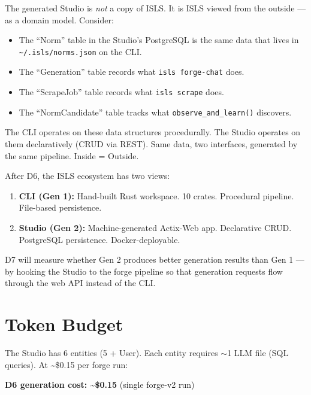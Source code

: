 \documentclass[11pt,a4paper]{article}
\begin{document}
The generated Studio is \emph{not} a copy of ISLS. It is ISLS viewed
from the outside --- as a domain model. Consider:

\begin{itemize}[nosep]
\item The ``Norm'' table in the Studio's PostgreSQL is the same data
      that lives in \texttt{\textasciitilde/.isls/norms.json} on the CLI.
\item The ``Generation'' table records what \texttt{isls forge-chat}
      does.
\item The ``ScrapeJob'' table records what \texttt{isls scrape} does.
\item The ``NormCandidate'' table tracks what
      \texttt{observe\_and\_learn()} discovers.
\end{itemize}

The CLI operates on these data structures procedurally. The Studio
operates on them declaratively (CRUD via REST). Same data, two
interfaces, generated by the same pipeline. Inside = Outside.

After D6, the ISLS ecosystem has two views:

\begin{enumerate}[nosep]
\item \textbf{CLI (Gen 1):} Hand-built Rust workspace. 10 crates.
      Procedural pipeline. File-based persistence.
\item \textbf{Studio (Gen 2):} Machine-generated Actix-Web app.
      Declarative CRUD. PostgreSQL persistence.
      Docker-deployable.
\end{enumerate}

D7 will measure whether Gen 2 produces better generation results
than Gen 1 --- by hooking the Studio to the forge pipeline so
that generation requests flow through the web API instead of the
CLI.


\section{Token Budget}

The Studio has 6 entities (5 + User). Each entity requires $\sim$1 LLM
file (SQL queries). At \textasciitilde\$0.15 per forge run:

\begin{center}
\textbf{D6 generation cost: \textasciitilde\$0.15} (single forge-v2 run)
\end{center}
\end{document}
